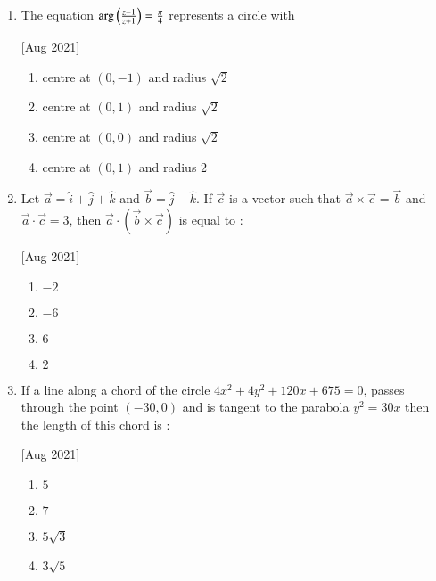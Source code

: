 \documentclass[journal,12pt,twocolumn]{IEEEtran}
\theoremstyle{remark}
\begin{document}
\begin{enumerate}
    \hfill[Aug 2021]
        \begin{enumerate}
            \item {}
            \item {}
            \item {}
            \item {} 
        \end{enumerate}

    \item The equation $\arg\left(\frac{z-1}{z+1}\right)=\frac{\pi}{4}$ represents a circle with
    
    \hfill[Aug 2021]
        \begin{enumerate}
            \item centre at $(0,-1)$ and radius $\sqrt{2}$
            \item centre at $(0,1)$ and radius $\sqrt{2}$
            \item centre at $(0,0)$ and radius $\sqrt{2}$
            \item centre at $(0,1)$ and radius $2$
        \end{enumerate}

    \item Let $\vec{a}=\hat{i}+\hat{j}+\hat{k}$ and $\vec{b}=\hat{j}-\hat{k}$. If $\vec{c}$ is a vector such that $\vec{a}\times\vec{c}=\vec{b}$ and $\vec{a}\cdot\vec{c}=3$, then $\vec{a}\cdot(\vec{b}\times\vec{c})$ is equal to :
    
    \hfill[Aug 2021]
        \begin{enumerate}
            \item $-2$
            \item $-6$
            \item $6$
            \item $2$
        \end{enumerate}

    \item If a line along a chord of the circle $4x^2+4y^2+120x+675=0$, passes through the point $(-30, 0)$ and is tangent to the parabola $y^2 = 30x$ then the length of this chord is :
    
    \hfill[Aug 2021]
        \begin{enumerate}
            \item $5$
            \item $7$
            \item $5\sqrt{3}$
            \item $3\sqrt{5}$
        \end{enumerate}


\end{enumerate}
\end{document}
